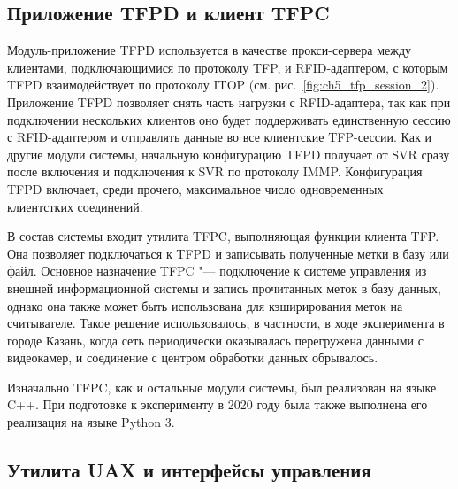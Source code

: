 \subsection{Приложение TFPD и клиент TFPC}\label{sec:ch5_components_tfpd_tfpc}

Модуль-приложение TFPD используется в качестве прокси-сервера между клиентами, подключающимися по протоколу TFP, и RFID-адаптером, с которым TFPD взаимодействует по протоколу ITOP (см. рис.~\ref{fig:ch5_tfp_session_2}). Приложение TFPD позволяет снять часть нагрузки с RFID-адаптера, так как при подключении нескольких клиентов оно будет поддерживать единственную сессию с RFID-адаптером и отправлять данные во все клиентские TFP-сессии. Как и другие модули системы, начальную конфигурацию TFPD получает от SVR сразу после включения и подключения к SVR по протоколу IMMP. Конфигурация TFPD включает, среди прочего, максимальное число одновременных клиентстких соединений.

В состав системы входит утилита TFPC, выполняющая функции клиента TFP. Она позволяет подключаться к TFPD и записывать полученные метки в базу или файл. Основное назначение TFPC "--- подключение к системе управления из внешней информационной системы и запись прочитанных меток в базу данных, однако она также может быть использована для кэширирования меток на считывателе. Такое решение использовалось, в частности, в ходе эксперимента в городе Казань, когда сеть периодически оказывалась перегружена данными с видеокамер, и соединение с центром обработки данных обрывалось.

Изначально TFPC, как и остальные модули системы, был реализован на языке C++. При подготовке к эксперименту в 2020 году была также выполнена его реализация на языке Python 3.



\subsection{Утилита UAX и интерфейсы управления}\label{sec:ch5_components_uax_and_cli}

